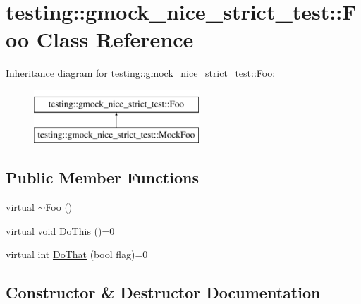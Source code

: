 \hypertarget{classtesting_1_1gmock__nice__strict__test_1_1Foo}{}\section{testing\+::gmock\+\_\+nice\+\_\+strict\+\_\+test\+::Foo Class Reference}
\label{classtesting_1_1gmock__nice__strict__test_1_1Foo}
Inheritance diagram for testing\+::gmock\+\_\+nice\+\_\+strict\+\_\+test\+::Foo\+:\begin{figure}[H]
\begin{center}
\leavevmode
\includegraphics[height=2.000000cm]{classtesting_1_1gmock__nice__strict__test_1_1Foo}
\end{center}
\end{figure}
\subsection*{Public Member Functions}
\begin{DoxyCompactItemize}
\item 
virtual \mbox{\hyperlink{classtesting_1_1gmock__nice__strict__test_1_1Foo_a7170ef9752ff35a749e63940461fb7ec}{$\sim$\+Foo}} ()
\item 
virtual void \mbox{\hyperlink{classtesting_1_1gmock__nice__strict__test_1_1Foo_a79a3cdbd8d9d9f6bc87580563b0d7cec}{Do\+This}} ()=0
\item 
virtual int \mbox{\hyperlink{classtesting_1_1gmock__nice__strict__test_1_1Foo_a8527a459b03f333a809a3376311a9f8b}{Do\+That}} (bool flag)=0
\end{DoxyCompactItemize}


\subsection{Constructor \& Destructor Documentation}
\mbox{\label{classtesting_1_1gmock__nice__strict__test_1_1Foo_a7170ef9752ff35a749e63940461fb7ec}} 
